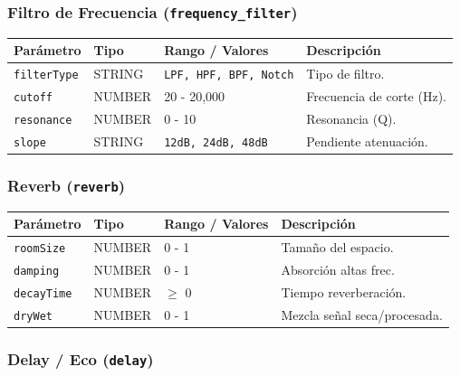 \subsubsection{Filtro de Frecuencia (\texttt{frequency\_filter})}

\begin{table}[H]
\centering
\small
\begin{tabular}{@{}llp{3cm}p{4cm}@{}}
\toprule
Parámetro & Tipo & Rango / Valores & Descripción \\ \midrule
\texttt{filterType} & STRING & \texttt{LPF, HPF, BPF, Notch} & Tipo de filtro. \\
\texttt{cutoff} & NUMBER & 20 - 20,000 & Frecuencia de corte (Hz). \\
\texttt{resonance} & NUMBER & 0 - 10 & Resonancia (Q). \\
\texttt{slope} & STRING & \texttt{12dB, 24dB, 48dB} & Pendiente atenuación. \\ \bottomrule
\end{tabular}
\end{table}

\subsubsection{Reverb (\texttt{reverb})}

\begin{table}[H]
\centering
\small
\begin{tabular}{@{}llp{3cm}p{4cm}@{}}
\toprule
Parámetro & Tipo & Rango / Valores & Descripción \\ \midrule
\texttt{roomSize} & NUMBER & 0 - 1 & Tamaño del espacio. \\
\texttt{damping} & NUMBER & 0 - 1 & Absorción altas frec. \\
\texttt{decayTime} & NUMBER & $\ge$ 0 & Tiempo reverberación. \\
\texttt{dryWet} & NUMBER & 0 - 1 & Mezcla señal seca/procesada. \\ \bottomrule
\end{tabular}
\end{table}

\subsubsection{Delay / Eco (\texttt{delay})}

